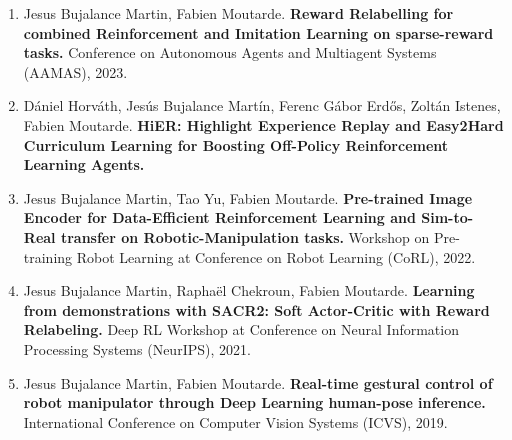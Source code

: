 \documentclass[letterpaper]{twentysecondcv} %
\begin{document}
\begin{enumerate}
    \item Jesus Bujalance Martin, Fabien Moutarde. \textbf{Reward Relabelling for combined Reinforcement and Imitation Learning on sparse-reward tasks.} Conference on Autonomous Agents and Multiagent Systems (AAMAS), 2023.
    \item Dániel Horváth, Jesús Bujalance Martín, Ferenc Gábor Erdős, Zoltán Istenes, Fabien Moutarde. \textbf{HiER: Highlight Experience Replay and Easy2Hard Curriculum Learning for Boosting Off-Policy Reinforcement Learning Agents.}
    \item Jesus Bujalance Martin, Tao Yu, Fabien Moutarde. \textbf{Pre-trained Image Encoder for Data-Efficient Reinforcement Learning and Sim-to-Real transfer on Robotic-Manipulation tasks.} Workshop on Pre-training Robot Learning at Conference on Robot Learning (CoRL), 2022.
    \item Jesus Bujalance Martin, Raphaël Chekroun, Fabien Moutarde. \textbf{Learning from demonstrations with SACR2: Soft Actor-Critic with Reward Relabeling.} Deep RL Workshop at Conference on Neural Information Processing Systems (NeurIPS), 2021.
    \item Jesus Bujalance Martin, Fabien Moutarde. \textbf{Real-time gestural control of robot manipulator through Deep Learning human-pose inference.} International Conference on Computer Vision Systems (ICVS), 2019.
\end{enumerate}



\end{document}
